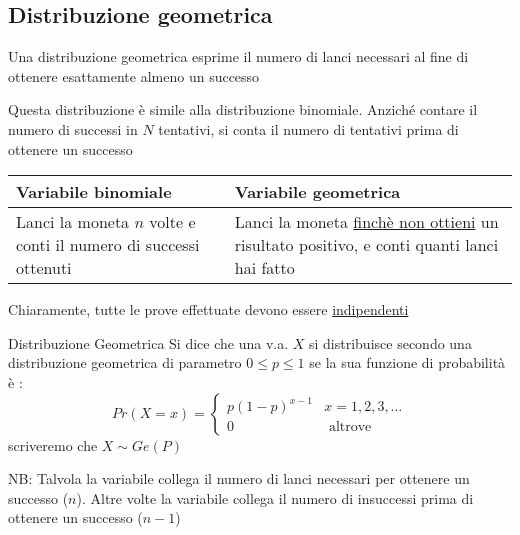 \subsection{Distribuzione geometrica}
\label{vageometrica}
\begin{tcolorbox}
	\begin{center}
		Una distribuzione geometrica esprime il numero di lanci necessari al fine di ottenere esattamente almeno un successo
	\end{center}
\end{tcolorbox}

Questa distribuzione è simile alla distribuzione binomiale. Anziché contare il numero di successi in $ N $ tentativi, si conta il numero di tentativi prima di ottenere un successo
\begin{table}[H]
	\centering
	\begin{tabular}{|>{\centering\arraybackslash}p{} >{\centering\arraybackslash}p{}|}
		\hline
		Variabile binomiale                                                & Variabile geometrica                                                                                 \\
		\hline
		Lanci la moneta $ n $ volte e conti il numero di successi ottenuti & Lanci la moneta \underline{finchè non ottieni} un risultato positivo, e conti quanti lanci hai fatto \\
		\hline
	\end{tabular}
\end{table}
Chiaramente, tutte le prove effettuate devono essere \underline{indipendenti}
\begin{definizione}{Distribuzione Geometrica}
	Si dice che una v.a. $ X $ si distribuisce secondo una distribuzione geometrica di parametro $ 0 \le  p \le  1 $ se la sua funzione di probabilità è :
	\[
		Pr\left(X = x\right) = \begin{cases}
			p\left(1-p\right)^{x-1} & x = 1,2,3,\ldots \\
			0                       & \text{ altrove }
		\end{cases}
	\]
	scriveremo che $ X \sim  Ge \left(P\right) $
\end{definizione}
NB: Talvola la variabile collega il numero di lanci necessari per ottenere un successo ($ n $). Altre volte la variabile collega il numero di insuccessi prima di ottenere un successo ($ n-1 $)
